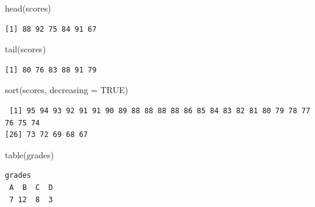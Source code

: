 \documentclass[
  letterpaper,
  DIV=11,
  numbers=noendperiod]{scrreprt}
\newenvironment{Shaded}{\begin{snugshade}}{\end{snugshade}}
\newcommand{\AttributeTok}[1]{\textcolor[rgb]{0.40,0.45,0.13}{#1}}
\newcommand{\ConstantTok}[1]{\textcolor[rgb]{0.56,0.35,0.01}{#1}}
\newcommand{\FunctionTok}[1]{\textcolor[rgb]{0.28,0.35,0.67}{#1}}
\newcommand{\NormalTok}[1]{\textcolor[rgb]{0.00,0.23,0.31}{#1}}
\begin{document}
\begin{tcolorbox}[enhanced jigsaw, colbacktitle=quarto-callout-tip-color!10!white, opacitybacktitle=0.6, breakable, left=2mm, leftrule=.75mm, toprule=.15mm, toptitle=1mm, bottomtitle=1mm, colframe=quarto-callout-tip-color-frame, opacityback=0, coltitle=black, arc=.35mm, titlerule=0mm, colback=white, bottomrule=.15mm, title=\textcolor{quarto-callout-tip-color}{\faLightbulb}\hspace{0.5em}{Answer}, rightrule=.15mm]

\begin{Shaded}
\begin{Highlighting}[]
\FunctionTok{head}\NormalTok{(scores)}
\end{Highlighting}
\end{Shaded}

\begin{verbatim}
[1] 88 92 75 84 91 67
\end{verbatim}

\begin{Shaded}
\begin{Highlighting}[]
\FunctionTok{tail}\NormalTok{(scores)}
\end{Highlighting}
\end{Shaded}

\begin{verbatim}
[1] 80 76 83 88 91 79
\end{verbatim}

\begin{Shaded}
\begin{Highlighting}[]
\FunctionTok{sort}\NormalTok{(scores, }\AttributeTok{decreasing =} \ConstantTok{TRUE}\NormalTok{)}
\end{Highlighting}
\end{Shaded}

\begin{verbatim}
 [1] 95 94 93 92 91 91 90 89 88 88 88 88 86 85 84 83 82 81 80 79 78 77 76 75 74
[26] 73 72 69 68 67
\end{verbatim}

\begin{Shaded}
\begin{Highlighting}[]
\FunctionTok{table}\NormalTok{(grades)}
\end{Highlighting}
\end{Shaded}

\begin{verbatim}
grades
 A  B  C  D 
 7 12  8  3 
\end{verbatim}

\end{tcolorbox}
\end{document}
